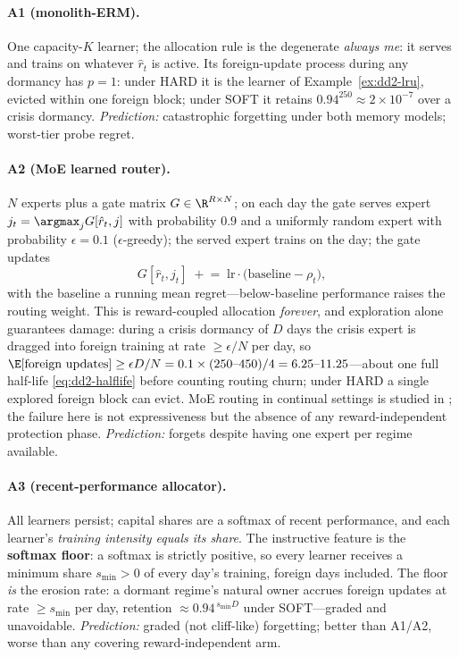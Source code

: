 \paragraph{A1 (monolith-ERM).} One capacity-$K$ learner; the allocation rule
is the degenerate \emph{always me}: it serves and trains on whatever
$\hat r_t$ is active. Its foreign-update process during any dormancy has
$p = 1$: under HARD it is the learner of Example~\ref{ex:dd2-lru}, evicted
within one foreign block; under SOFT it retains
$0.94^{250} \approx 2 \times 10^{-7}$ over a crisis dormancy.
\emph{Prediction:} catastrophic forgetting under both memory models;
worst-tier probe regret.

\paragraph{A2 (MoE learned router).} $N$ experts plus a gate matrix
$G \in \R^{R \times N}$; on each day the gate serves expert
$j_t = \argmax_j G[\hat r_t, j]$ with probability $0.9$ and a uniformly
random expert with probability $\epsilon = 0.1$ ($\epsilon$-greedy); the
served expert trains on the day; the gate updates
\[
G[\hat r_t, j_t] \;\mathrel{+}=\; \mathrm{lr} \cdot
\bigl(\text{baseline} - \rho_{t}\bigr),
\]
with the baseline a running mean regret---below-baseline performance raises
the routing weight. This is reward-coupled allocation \emph{forever}, and
exploration alone guarantees damage: during a crisis dormancy of $D$ days
the crisis expert is dragged into foreign training at rate
$\ge \epsilon/N$ per day, so
$\E[\text{foreign updates}] \ge \epsilon D / N
= 0.1 \times (250\text{--}450)/4 = 6.25\text{--}11.25$---about one full
half-life \eqref{eq:dd2-halflife} before counting routing churn; under HARD
a single explored foreign block can evict. MoE routing in continual settings
is studied in \citet{li2024moecl}; the failure here is not expressiveness
but the absence of any reward-independent protection phase.
\emph{Prediction:} forgets despite having one expert per regime available.

\paragraph{A3 (recent-performance allocator).} All learners persist; capital
shares are a softmax of recent performance, and each learner's
\emph{training intensity equals its share}. The instructive feature is the
\textbf{softmax floor}: a softmax is strictly positive, so every learner
receives a minimum share $s_{\min} > 0$ of every day's training, foreign
days included. The floor \emph{is} the erosion rate: a dormant regime's
natural owner accrues foreign updates at rate $\ge s_{\min}$ per day,
retention $\approx 0.94^{\,s_{\min} D}$ under SOFT---graded and unavoidable.
\emph{Prediction:} graded (not cliff-like) forgetting; better than A1/A2,
worse than any covering reward-independent arm.

